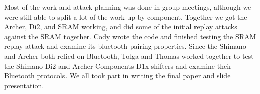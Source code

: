 \documentclass[letterpaper,twocolumn,10pt]{article}
\begin{document}
Most of the work and attack planning was done in group meetings, although we were still able to split a lot of the work up by component. Together we got the Archer, Di2, and SRAM working, and did some of the initial replay attacks against the SRAM together. Cody wrote the code and finished testing the SRAM replay attack and examine its bluetooth pairing properties. Since the Shimano and Archer both relied on Bluetooth, Tolga and Thomas worked together to test the Shimano Di2 and Archer Components D1x shifters and examine their Bluetooth protocols. We all took part in writing the final paper and slide presentation.

\end{document}
